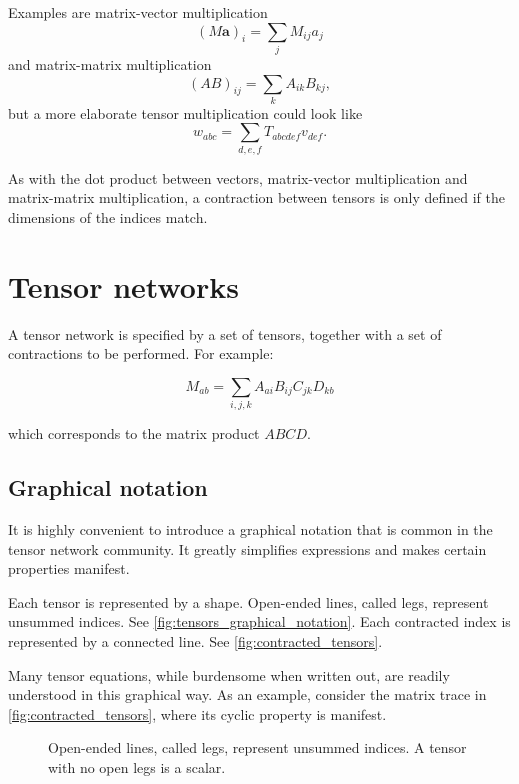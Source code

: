 Examples are matrix-vector multiplication
\begin{equation}
  (M \bm{a})_{i} = \sum_j M_{i j} a_j
\end{equation}
and matrix-matrix multiplication
\begin{equation}
  (A B)_{i j} = \sum_k A_{i k} B_{k j},
\end{equation}
but a more elaborate tensor multiplication could look like
\begin{equation}
  w_{a b c} = \sum_{d, e, f} T_{a b c d e f} v_{d e f}.
\end{equation}

As with the dot product between vectors, matrix-vector multiplication and
matrix-matrix multiplication, a contraction between tensors is only defined if
the dimensions of the indices match.

\section{Tensor networks}

A tensor network is specified by a set of tensors, together with a set of contractions to be performed. For example:

\begin{equation}
  M_{a b} = \sum_{i, j, k} A_{a i} B_{i j} C_{j k} D_{k b}
\end{equation}

which corresponds to the matrix product $A B C D$.

\subsection{Graphical notation}
It is highly convenient to introduce a graphical notation that is common in the
tensor network community. It greatly simplifies expressions and makes certain
properties manifest.

Each tensor is represented by a shape. Open-ended lines, called legs, represent
unsummed indices. See \autoref{fig:tensors_graphical_notation}. Each contracted
index is represented by a connected line. See \autoref{fig:contracted_tensors}.

Many tensor equations, while burdensome when written out, are readily
understood in this graphical way. As an example, consider the matrix trace in
\autoref{fig:contracted_tensors}, where its cyclic property is manifest.

\begin{figure}
  
  \caption{Open-ended lines, called legs, represent unsummed indices. A tensor
  with no open legs is a scalar.}
  \label{fig:tensors_graphical_notation}
\end{figure}

